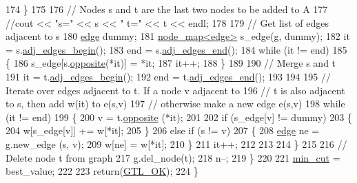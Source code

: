 \begin{DoxyCode}
174         \}
175 
176         \textcolor{comment}{// Nodes s and t are the last two nodes to be added to A}
177         \textcolor{comment}{//cout << "s=" << s << " t=" << t << endl;}
178 
179         \textcolor{comment}{// Get list of edges adjacent to s}
180         \mbox{\hyperlink{classedge}{edge}} dummy;
181         \mbox{\hyperlink{classnode__map}{node\_map<edge>}} s\_edge(\mbox{\hyperlink{rings_8cpp_aa9df5aa3976a89a96a5f1c7611d42938}{g}}, dummy);
182         it = s.\mbox{\hyperlink{classnode_a788d3e932a5c164caa5ec82aa47551b2}{adj\_edges\_begin}}();
183         end = s.\mbox{\hyperlink{classnode_aa1e7887d29390297580769454f769ad6}{adj\_edges\_end}}();
184         \textcolor{keywordflow}{while} (it != end)
185         \{
186             s\_edge[s.\mbox{\hyperlink{classnode_a13dbd1809a33a5efede64a359e53a363}{opposite}}(*it)] = *it;
187             it++;
188         \}
189 
190         \textcolor{comment}{// Merge s and t}
191         it = t.\mbox{\hyperlink{classnode_a788d3e932a5c164caa5ec82aa47551b2}{adj\_edges\_begin}}();
192         end = t.\mbox{\hyperlink{classnode_aa1e7887d29390297580769454f769ad6}{adj\_edges\_end}}();
193 
194 
195         \textcolor{comment}{// Iterate over edges adjacent to t. If a node v adjacent to}
196         \textcolor{comment}{// t is also adjacent to s, then add w(it) to e(s,v)}
197         \textcolor{comment}{// otherwise make a new edge e(s,v)}
198         \textcolor{keywordflow}{while} (it != end)
199         \{
200             v = t.\mbox{\hyperlink{classnode_a13dbd1809a33a5efede64a359e53a363}{opposite}} (*it);
201 
202             \textcolor{keywordflow}{if} (s\_edge[v] != dummy)
203             \{
204                 w[s\_edge[v]] += w[*it];
205             \}
206             \textcolor{keywordflow}{else} \textcolor{keywordflow}{if} (s != v)
207             \{
208                 \mbox{\hyperlink{classedge}{edge}} ne = \mbox{\hyperlink{rings_8cpp_aa9df5aa3976a89a96a5f1c7611d42938}{g}}.new\_edge (s, v);
209                 w[ne] = w[*it];
210             \}               
211             it++;
212 
213             
214         \}
215 
216         \textcolor{comment}{// Delete node t from graph}
217         \mbox{\hyperlink{rings_8cpp_aa9df5aa3976a89a96a5f1c7611d42938}{g}}.del\_node(t);
218         n--;
219     \}
220     
221     \mbox{\hyperlink{classmincut_a0d7cc01f8dd8b09c58dfb08c1123415f}{min\_cut}} = best\_value;
222 
223     \textcolor{keywordflow}{return}(\mbox{\hyperlink{classalgorithm_af1a0078e153aa99c24f9bdf0d97f6710a5114c20e4a96a76b5de9f28bf15e282b}{GTL\_OK}});
224 \}
\end{DoxyCode}
